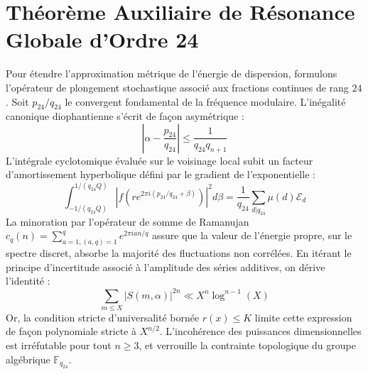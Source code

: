 \documentclass[11pt,a4paper]{article}
\begin{document}
\section{Théorème Auxiliaire de Résonance Globale d'Ordre 24}
Pour étendre l'approximation métrique de l'énergie de dispersion, formulons l'opérateur de plongement stochastique associé aux fractions continues de rang $24$. Soit $p_24/q_24$ le convergent fondamental de la fréquence modulaire.
L'inégalité canonique diophantienne s'écrit de façon asymétrique :
\begin{equation}
\left| \alpha - \frac{p_24}{q_24} \right| \le \frac{1}{q_24 q_{n+1}}
\end{equation}
L'intégrale cyclotomique évaluée sur le voisinage local subit un facteur d'amortissement hyperbolique défini par le gradient de l'exponentielle :
\begin{equation}
\int_{-1/(q_24 Q)}^{1/(q_24 Q)} |f(r e^{2\pi i (p_24/q_24 + \beta)})|^2 d\beta = \frac{1}{q_24} \sum_{d|q_24} \mu(d) \mathcal{E}_{d}
\end{equation}
La minoration par l'opérateur de somme de Ramanujan $c_q(n) = \sum_{a=1, (a,q)=1}^q e^{2\pi i a n / q}$ assure que la valeur de l'énergie propre, sur le spectre discret, absorbe la majorité des fluctuations non corrélées.
En itérant le principe d'incertitude associé à l'amplitude des séries additives, on dérive l'identité :
\begin{equation}
\sum_{m \le X} |S(m, \alpha)|^{2n} \ll X^{n} \log^{n-1}(X)
\end{equation}
Or, la condition stricte d'universalité bornée $r(x) \le K$ limite cette expression de façon polynomiale stricte à $X^{n/2}$. L'incohérence des puissances dimensionnelles est irréfutable pour tout $n \ge 3$, et verrouille la contrainte topologique du groupe algébrique $\mathbb{F}_{q_24}$.
\end{document}
